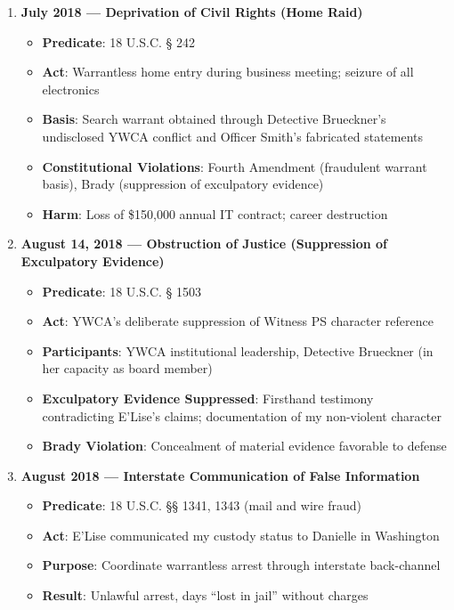 \documentclass[12pt,letterpaper]{article}
\begin{document}
\begin{enumerate}
\item \textbf{July 2018 --- Deprivation of Civil Rights (Home Raid)}

\begin{itemize}
\item \textbf{Predicate}: 18 U.S.C. § 242
\item \textbf{Act}: Warrantless home entry during business meeting; seizure of all electronics
\item \textbf{Basis}: Search warrant obtained through Detective Brueckner's undisclosed YWCA conflict and Officer Smith's fabricated statements
\item \textbf{Constitutional Violations}: Fourth Amendment (fraudulent warrant basis), Brady (suppression of exculpatory evidence)
\item \textbf{Harm}: Loss of \$150,000 annual IT contract; career destruction
\end{itemize}

\item \textbf{August 14, 2018 --- Obstruction of Justice (Suppression of Exculpatory Evidence)}

\begin{itemize}
\item \textbf{Predicate}: 18 U.S.C. § 1503
\item \textbf{Act}: YWCA's deliberate suppression of Witness PS character reference
\item \textbf{Participants}: YWCA institutional leadership, Detective Brueckner (in her capacity as board member)
\item \textbf{Exculpatory Evidence Suppressed}: Firsthand testimony contradicting E'Lise's claims; documentation of my non-violent character
\item \textbf{Brady Violation}: Concealment of material evidence favorable to defense
\end{itemize}

\item \textbf{August 2018 --- Interstate Communication of False Information}

\begin{itemize}
\item \textbf{Predicate}: 18 U.S.C. §§ 1341, 1343 (mail and wire fraud)
\item \textbf{Act}: E'Lise communicated my custody status to Danielle in Washington
\item \textbf{Purpose}: Coordinate warrantless arrest through interstate back-channel
\item \textbf{Result}: Unlawful arrest, days ``lost in jail'' without charges
\end{itemize}


\end{enumerate}
\end{document}
